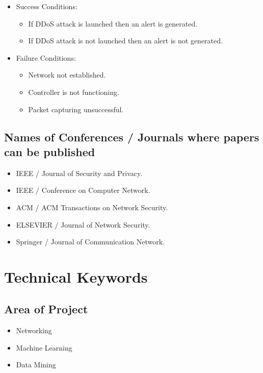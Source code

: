 \documentclass[12pt,a4paper,final]{report}
\begin{document}
\begin{itemize}
\item Success Conditions: 
\begin{itemize}
\item If DDoS attack is launched then an alert is generated.
\item If DDoS attack is not launched then an alert is not generated.
\end{itemize}
	
\item Failure Conditions:
\begin{itemize}
\item Network not established.
\item Controller is not functioning.
\item Packet capturing unsuccessful.
\end{itemize}		

\end{itemize}

\newpage
\section{Names of Conferences / Journals where papers can be published}
\begin{itemize}
\item IEEE / Journal of Security and Privacy.
\item IEEE / Conference on Computer Network.
\item ACM / ACM Transactions on Network Security.
\item ELSEVIER / Journal of Network Security.
\item Springer / Journal of Communication Network.
\end{itemize}
\newpage

\chapter{Technical Keywords}
\thispagestyle{empty}
\newpage
\section{Area of Project}
\begin{itemize}
\item Networking
\item Machine Learning
\item Data Mining
\end{itemize}
\end{document}
